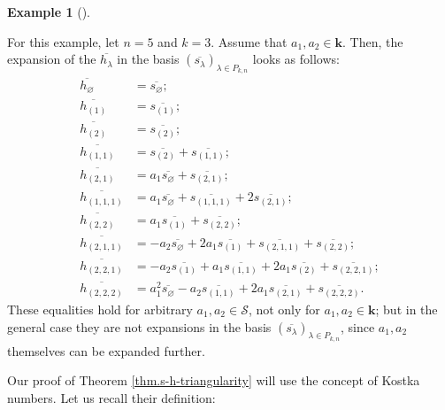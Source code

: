 \documentclass[numbers=enddot,12pt,final,onecolumn,notitlepage]{scrartcl}%
\theoremstyle{definition}
\newtheorem{exmp}[theo]{Example}
\newenvironment{example}[1][]
{\begin{exmp}[#1]\begin{leftbar}}
{\end{leftbar}\end{exmp}}
\begin{document}
\begin{example}
For this example, let $n=5$ and $k=3$. Assume that $a_{1},a_{2}\in\mathbf{k}$.
Then, the expansion of the $\overline{h_{\lambda}}$ in the basis $\left(
\overline{s_{\lambda}}\right)  _{\lambda\in P_{k,n}}$ looks as follows:%
\begin{align*}
\overline{h_{\varnothing}}  &  =\overline{s_{\varnothing}};\\
\overline{h_{\left(  1\right)  }}  &  =\overline{s_{\left(  1\right)  }};\\
\overline{h_{\left(  2\right)  }}  &  =\overline{s_{\left(  2\right)  }};\\
\overline{h_{\left(  1,1\right)  }}  &  =\overline{s_{\left(  2\right)  }%
}+\overline{s_{\left(  1,1\right)  }};\\
\overline{h_{\left(  2,1\right)  }}  &  =a_{1}\overline{s_{\varnothing}%
}+\overline{s_{\left(  2,1\right)  }};\\
\overline{h_{\left(  1,1,1\right)  }}  &  =a_{1}\overline{s_{\varnothing}%
}+\overline{s_{\left(  1,1,1\right)  }}+2\overline{s_{\left(  2,1\right)  }%
};\\
\overline{h_{\left(  2,2\right)  }}  &  =a_{1}\overline{s_{\left(  1\right)
}}+\overline{s_{\left(  2,2\right)  }};\\
\overline{h_{\left(  2,1,1\right)  }}  &  =-a_{2}\overline{s_{\varnothing}%
}+2a_{1}\overline{s_{\left(  1\right)  }}+\overline{s_{\left(  2,1,1\right)
}}+\overline{s_{\left(  2,2\right)  }};\\
\overline{h_{\left(  2,2,1\right)  }}  &  =-a_{2}\overline{s_{\left(
1\right)  }}+a_{1}\overline{s_{\left(  1,1\right)  }}+2a_{1}\overline
{s_{\left(  2\right)  }}+\overline{s_{\left(  2,2,1\right)  }};\\
\overline{h_{\left(  2,2,2\right)  }}  &  =a_{1}^{2}\overline{s_{\varnothing}%
}-a_{2}\overline{s_{\left(  1,1\right)  }}+2a_{1}\overline{s_{\left(
2,1\right)  }}+\overline{s_{\left(  2,2,2\right)  }}.
\end{align*}
These equalities hold for arbitrary $a_{1},a_{2}\in\mathcal{S}$, not only for
$a_{1},a_{2}\in\mathbf{k}$; but in the general case they are not expansions in
the basis $\left(  \overline{s_{\lambda}}\right)  _{\lambda\in P_{k,n}}$,
since $a_{1},a_{2}$ themselves can be expanded further.
\end{example}

Our proof of Theorem \ref{thm.s-h-triangularity} will use the concept of
Kostka numbers. Let us recall their definition:
\end{document}
